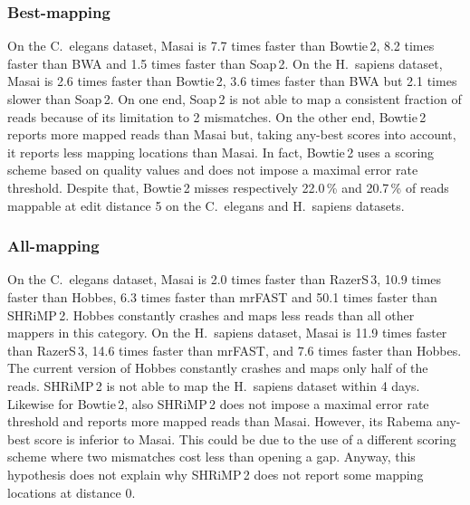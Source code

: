 \subsubsection{Best-mapping}
On the C.~elegans dataset, Masai is 7.7 times faster than Bowtie\,2, 8.2 times faster than BWA and 1.5 times faster than Soap\,2.
On the H.~sapiens dataset, Masai is 2.6 times faster than Bowtie\,2, 3.6 times faster than BWA but 2.1 times slower than Soap\,2.
On one end, Soap\,2 is not able to map a consistent fraction of reads because of its limitation to 2 mismatches.
On the other end, Bowtie\,2 reports more mapped reads than Masai but, taking any-best scores into account, it reports less mapping locations than Masai.
In fact, Bowtie\,2 uses a scoring scheme based on quality values and does not impose a maximal error rate threshold.
Despite that, Bowtie\,2 misses respectively 22.0\,\% and 20.7\,\% of reads mappable at edit distance 5 on the C.~elegans and H.~sapiens datasets.

\subsubsection{All-mapping}
On the C.~elegans dataset, Masai is 2.0 times faster than RazerS\,3, 10.9 times faster than Hobbes, 6.3 times faster than mrFAST and 50.1 times faster than SHRiMP\,2.
Hobbes constantly crashes and maps less reads than all other mappers in this category.
On the H.~sapiens dataset, Masai is 11.9 times faster than RazerS\,3, 14.6 times faster than mrFAST, and 7.6 times faster than Hobbes.
The current version of Hobbes constantly crashes and maps only half of the reads.
SHRiMP\,2 is not able to map the H.~sapiens dataset within 4 days.
Likewise for Bowtie\,2, also SHRiMP\,2 does not impose a maximal error rate threshold and reports more mapped reads than Masai.
However, its Rabema any-best score is inferior to Masai.
This could be due to the use of a different scoring scheme where two mismatches cost less than opening a gap.
Anyway, this hypothesis does not explain why SHRiMP\,2 does not report some mapping locations at distance 0.

